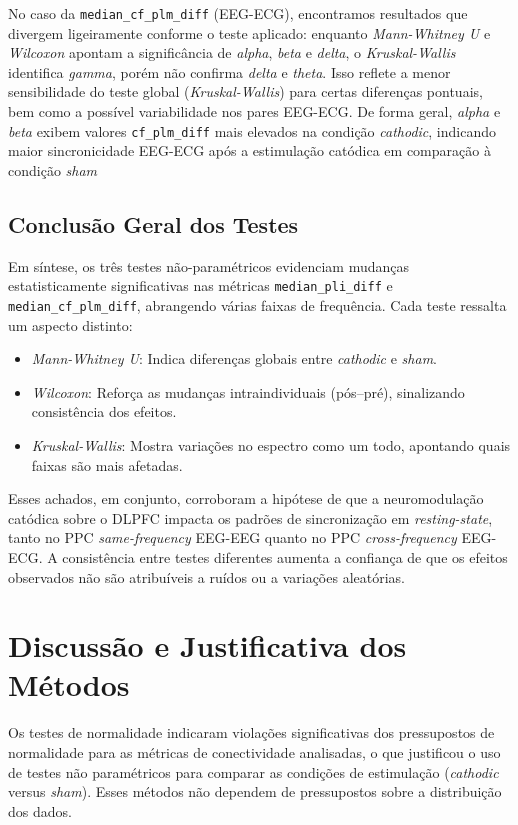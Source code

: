 No caso da \texttt{median\_cf\_plm\_diff} (EEG-ECG), encontramos resultados que divergem ligeiramente conforme o teste aplicado: enquanto \textit{Mann-Whitney U} e \textit{Wilcoxon} apontam a significância de \textit{alpha}, \textit{beta} e \textit{delta}, o \textit{Kruskal-Wallis} identifica \textit{gamma}, porém não confirma \textit{delta} e \textit{theta}. Isso reflete a menor sensibilidade do teste global (\textit{Kruskal-Wallis}) para certas diferenças pontuais, bem como a possível variabilidade nos pares EEG-ECG. De forma geral, \textit{alpha} e \textit{beta} exibem valores \texttt{cf\_plm\_diff} mais elevados na condição \textit{cathodic}, indicando maior sincronicidade EEG-ECG após a estimulação catódica em comparação à condição \textit{sham}


\subsection{Conclusão Geral dos Testes}
Em síntese, os três testes não-paramétricos evidenciam mudanças estatisticamente significativas nas métricas \texttt{median\_pli\_diff} e \texttt{median\_cf\_plm\_diff}, abrangendo várias faixas de frequência. Cada teste ressalta um aspecto distinto:
\begin{itemize}
    \item \textit{Mann-Whitney U}: Indica diferenças globais entre \textit{cathodic} e \textit{sham}.
    \item \textit{Wilcoxon}: Reforça as mudanças intraindividuais (pós--pré), sinalizando consistência dos efeitos.
    \item \textit{Kruskal-Wallis}: Mostra variações no espectro como um todo, apontando quais faixas são mais afetadas.
\end{itemize}

Esses achados, em conjunto, corroboram a hipótese de que a neuromodulação catódica sobre o DLPFC impacta os padrões de sincronização em \textit{resting-state}, tanto no PPC \textit{same-frequency} EEG-EEG quanto no PPC \textit{cross-frequency} EEG-ECG. A consistência entre testes diferentes aumenta a confiança de que os efeitos observados não são atribuíveis a ruídos ou a variações aleatórias.

\section{Discussão e Justificativa dos Métodos}
Os testes de normalidade indicaram violações significativas dos pressupostos de normalidade para as métricas de conectividade analisadas, o que justificou o uso de testes não paramétricos para comparar as condições de estimulação (\textit{cathodic} versus \textit{sham}). Esses métodos não dependem de pressupostos sobre a distribuição dos dados.

